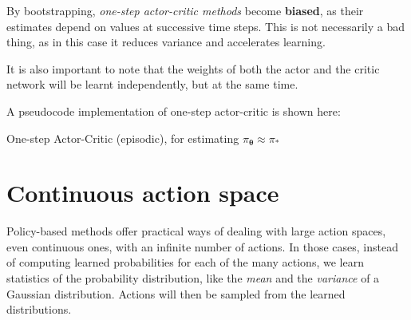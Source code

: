 By bootstrapping, \textit{one-step actor-critic methods} become \textbf{biased}, as their estimates depend on values at successive time steps. This is not necessarily a bad thing, as in this case it reduces variance and accelerates learning.

It is also important to note that the weights of both the actor and the critic network will be learnt independently, but at the same time.

A pseudocode implementation of one-step actor-critic is shown here:

\begin{algorithm}[H]
\DontPrintSemicolon
\SetAlgoVlined
{}

\caption{One-step Actor-Critic (episodic), for estimating $\pi_{\boldsymbol{\theta}} \approx \pi_*$}
\end{algorithm}

\section{Continuous action space}
Policy-based methods offer practical ways of dealing with large action spaces, even continuous ones, with an infinite number of actions. In those cases, instead of computing learned probabilities for each of the many actions, we learn statistics of the probability distribution, like the \textit{mean} and the \textit{variance} of a Gaussian distribution. Actions will then be sampled from the learned distributions.
